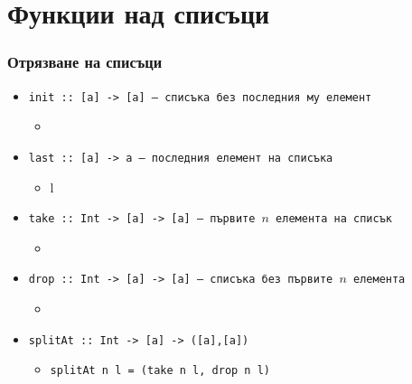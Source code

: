 \documentclass{beamer}
\begin{document}
\section{Функции над списъци}

\begin{frame}
  \frametitle{Отрязване на списъци}
  \begin{itemize}
  \item \tt{init :: [a] -> [a]} --- списъка без последния му елемент
    \begin{itemize}
    \item {}
    \end{itemize}
  \item \tt{last :: [a] -> a} --- последния елемент на списъка
    \begin{itemize}
    \item {}l
    \end{itemize}
  \item \tt{take :: Int -> [a] -> [a]} --- първите $n$ елемента на списък
    \begin{itemize}
    \item {}
    \end{itemize}
  \item \tt{drop :: Int -> [a] -> [a]} --- списъка без първите $n$ елемента
    \begin{itemize}
    \item {}
    \end{itemize}
  \item \tt{splitAt :: Int -> [a] -> ([a],[a])}
    \begin{itemize}
    \item \tt{splitAt n l = (take n l, drop n l)}
    \end{itemize}
  \end{itemize}
\end{frame}
\end{document}
